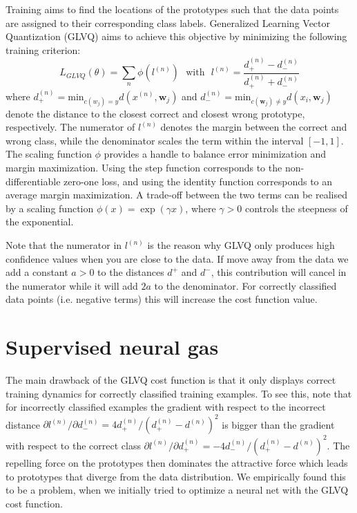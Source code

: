 \documentclass{esannV2}
\begin{document}
Training aims to find the locations of the prototypes such that the data points are assigned to their corresponding class labels. Generalized Learning Vector Quantization (GLVQ) \cite{sato1996generalized} aims to achieve this objective by minimizing the following training criterion:
\begin{equation}
 L_{GLVQ}(\theta) = \sum_n \phi(l^{(n)}) \mbox{~~with~~} l^{(n)} = \frac{d^{(n)}_+ - d^{(n)}_-}{d^{(n)}_+ + d^{(n)}_-}
\end{equation}
where $d^{(n)}_+ = \mbox{min}_{c(w_j) = y} d(x^{(n)}, \mathbf{w}_j)$ and $d^{(n)}_- = \mbox{min}_{c(\mathbf{w}_j)\neq y} d(x_i, \mathbf{w}_j)$ denote the distance to the closest correct and closest wrong prototype, respectively. The numerator of $l^{(n)}$ denotes the margin between the correct and wrong class, while the denominator scales the term within the interval $[-1, 1]$. The scaling function $\phi$ provides a handle to balance error minimization and margin maximization. Using the step function corresponds to the non-differentiable zero-one loss, and using the identity function corresponds to an average margin maximization. A trade-off between the two terms can be realised by a scaling function $\phi(x) = \exp(\gamma x)$, where $\gamma > 0$ controls the steepness of the exponential. 

Note that the numerator in $l^{(n)}$ is the reason why GLVQ only produces high confidence values when you are close to the data. If move away from the data we add a constant $a > 0$ to the distances $d^+$ and $d^-$, this contribution will cancel in the numerator while it will add $2a$ to the denominator. For correctly classified data points (i.e. negative terms) this will increase the cost function value.

\section{Supervised neural gas}
The main drawback of the GLVQ cost function is that it only displays correct training dynamics for correctly classified training examples\cite{sato1996generalized}.  To see this, note that for incorrectly classified examples the gradient with respect to the incorrect distance $\partial l^{(n)} / \partial d^{(n)}_- = 4d^{(n)}_+/(d^{(n)}_+ - d^{(n)})^2$ is bigger than the gradient with respect to the correct class $\partial l^{(n)} / \partial d^{(n)}_+ = -4d^{(n)}_-/(d^{(n)}_+ - d^{(n)})^2$. The repelling force on the prototypes then dominates the attractive force which leads to prototypes that diverge from the data distribution. We empirically found this to be a problem, when we initially tried to optimize a neural net with the GLVQ cost function. 
\end{document}
